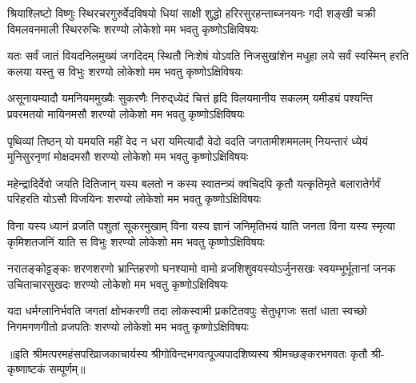 
\fourlineindentedshloka
{श्रियाश्लिष्टो विष्णुः स्थिरचरगुरुर्वेदविषयो}
{धियां साक्षी शुद्धो हरिरसुरहन्ताब्जनयनः}
{गदी शङ्खी चक्री विमलवनमाली स्थिररुचिः}
{शरण्यो लोकेशो मम भवतु कृष्णोऽक्षिविषयः}

\fourlineindentedshloka
{यतः सर्वं जातं वियदनिलमुख्यं जगदिदम्}
{स्थितौ निःशेषं योऽवति निजसुखांशेन मधुहा}
{लये सर्वं स्वस्मिन् हरति कलया यस्तु स विभुः}
{शरण्यो लोकेशो मम भवतु कृष्णोऽक्षिविषयः}

\fourlineindentedshloka
{असूनायम्यादौ यमनियममुख्यैः सुकरणैः}
{निरुद्‌ध्येदं चित्तं हृदि विलयमानीय सकलम्}
{यमीड्यं पश्यन्ति प्रवरमतयो मायिनमसौ}
{शरण्यो लोकेशो मम भवतु कृष्णोऽक्षिविषयः}

\fourlineindentedshloka
{पृथिव्यां तिष्ठन् यो यमयति महीं वेद न धरा}
{यमित्यादौ वेदो वदति जगतामीशममलम्}
{नियन्तारं ध्येयं मुनिसुरनृणां मोक्षदमसौ}
{शरण्यो लोकेशो मम भवतु कृष्णोऽक्षिविषयः}

\fourlineindentedshloka
{महेन्द्रादिर्देवो जयति दितिजान् यस्य बलतो}
{न कस्य स्वातन्त्र्यं क्वचिदपि कृतौ यत्कृतिमृते}
{बलारातेर्गर्वं परिहरति योऽसौ विजयिनः}
{शरण्यो लोकेशो मम भवतु कृष्णोऽक्षिविषयः}

\fourlineindentedshloka
{विना यस्य ध्यानं व्रजति पशुतां सूकरमुखाम्}
{विना यस्य ज्ञानं जनिमृतिभयं याति जनता}
{विना यस्य स्मृत्या कृमिशतजनिं याति स विभुः}
{शरण्यो लोकेशो मम भवतु कृष्णोऽक्षिविषयः}

\fourlineindentedshloka
{नरातङ्कोट्टङ्कः शरणशरणो भ्रान्तिहरणो}
{घनश्यामो वामो व्रजशिशुवयस्योऽर्जुनसखः}
{स्वयम्भूर्भूतानां जनक उचिताचारसुखदः}
{शरण्यो लोकेशो मम भवतु कृष्णोऽक्षिविषयः}

\fourlineindentedshloka
{यदा धर्मग्लानिर्भवति जगतां क्षोभकरणी}
{तदा लोकस्वामी प्रकटितवपुः सेतुधृगजः}
{सतां धाता स्वच्छो निगमगणगीतो व्रजपतिः}
{शरण्यो लोकेशो मम भवतु कृष्णोऽक्षिविषयः}

॥इति श्रीमत्परमहंसपरिव्राजकाचार्यस्य श्रीगोविन्दभगवत्पूज्यपादशिष्यस्य 
श्रीमच्छङ्करभगवतः कृतौ श्री-कृष्णाष्टकं सम्पूर्णम्॥